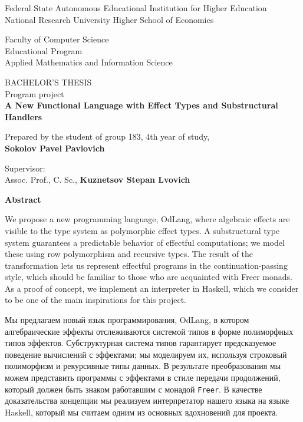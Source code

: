 \documentclass[a4paper,14pt]{extreport}
\begin{document}
\begin{titlepage}
\begin{center}
    Federal State Autonomous Educational Institution for Higher Education \\
    National Research University Higher School of Economics

    \vspace{1cm}
    Faculty of Computer Science \\
    Educational Program \\
    Applied Mathematics and Information Science

    \vspace{3cm}
    BACHELOR'S THESIS \\
    Program project \\
    \textbf{A New Functional Language with Effect Types
    and Substructural Handlers}
\end{center}
\vspace{1cm}
Prepared by the student of group 183, 4th year of study, \\
\textbf{Sokolov Pavel Pavlovich}

\vspace{0.5cm}
\noindent Supervisor: \hfill \\
Assoc. Prof., C. Sc., \textbf{Kuznetsov Stepan Lvovich}

\vfill
{}
\end{titlepage}

\tableofcontents

\newpage

\begin{center}\textbf{Abstract}\end{center}

We propose a new programming language, OdLang, where algebraic effects are
visible to the type system as polymorphic effect types. A substructural type
system guarantees a predictable behavior of effectful computations; we model
these using row polymorphism and recursive types. The result of the
transformation lets us represent effectful programs in the continuation-passing
style, which should be familiar to those who are acquainted with Freer monads.
As a proof of concept, we implement an interpreter in Haskell, which we consider
to be one of the main inspirations for this project.

Мы предлагаем новый язык программирования, OdLang, в котором алгебраические
эффекты отслеживаются системой типов в форме поли\-морфных типов эффектов.
Субструктурная система типов гарантирует предсказуемое поведение вычислений с
эффектами; мы моделируем их, используя строковый полиморфизм и рекурсивные типы
данных. В ре\-зультате преобразования мы можем представить программы с эффектами
в стиле передачи продолжений, который должен быть знаком работавшим с монадой
\verb|Freer|. В качестве доказательства концепции мы реализуем интерпретатор
нашего языка на языке Haskell, который мы считаем одним из основных
вдохновений для проекта.
\end{document}
